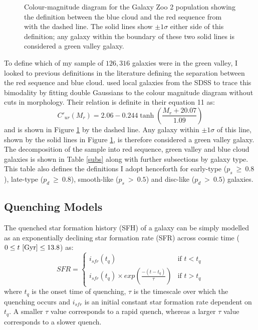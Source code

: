 \documentclass{mn2e}
\begin{document}
\begin{figure}
\caption{Colour-magnitude diagram for the Galaxy Zoo 2 population showing the definition between the blue cloud and the red sequence from \citet{Baldry04} with the dashed line. The solid lines show $\pm 1\sigma$ either side of this definition; any galaxy within the boundary of these two solid lines is considered a green valley galaxy.}
\label{CMGV}
\end{figure}

To define which of my sample of $126, 316$ galaxies were in the green valley, I looked to previous definitions in the literature defining the separation between the red sequence and blue cloud. \citet{Baldry04} used local galaxies from the SDSS to trace this bimodality by fitting double Gaussians to the colour magnitude diagram without cuts in morphology. Their relation is definite in their equation 11 as:
\begin{equation}
C'_{ur}(M_{r}) = 2.06 - 0.244 \tanh \left( \frac{M_r + 20.07}{1.09}\right)
\end{equation}
and is shown in Figure \ref{CMGV} by the dashed line. Any galaxy within $\pm 1\sigma$ of this line, shown by the solid lines in Figure \ref{CMGV}, is therefore considered a green valley galaxy. The decomposition of the sample into red sequence, green valley and blue cloud galaxies is shown in Table \ref{subs} along with further subsections by galaxy type. This table also defines the definitions I adopt henceforth for early-type ($p_s~ \geq~0.8$), late-type ($p_d~ \geq~0.8$), smooth-like ($p_s~ >~0.5$) and disc-like ($p_d~ >~0.5$) galaxies. 


\subsection{Quenching Models}\label{quench}
The quenched star formation history (SFH) of a galaxy can be simply modelled as an exponentially declining star formation rate (SFR) across cosmic time ($0 \leq t ~\rm{[Gyr]} \leq 13.8$) as:
\begin{equation}\label{sfh}
SFR =
\begin{cases}
i_{sfr}(t_q) & \text{if } t < t_q \\
i_{sfr}(t_q) \times exp{\left( \frac{-(t-t_{q})}{\tau}\right)} & \text{if } t > t_q 
\end{cases}
\end{equation}
where $t_{q}$ is the onset time of quenching, $\tau$ is the timescale over which the quenching occurs and $i_{sfr}$ is an initial constant star formation rate dependent on $t_q$.  A smaller $\tau$ value corresponds to a rapid quench, whereas a larger $\tau$ value corresponds to a slower quench. 
\end{document}
